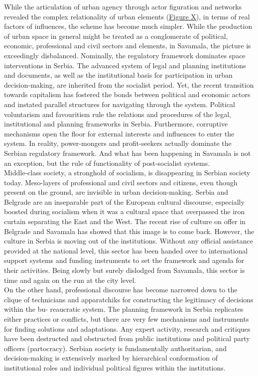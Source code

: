 \documentclass[11pt]{report}
\begin{document}
{{{While the articulation of urban agency through actor figuration and networks revealed the complex relationality of urban elements (\href{ANT diagram}{Figure X}), in terms of real factors of influences, the scheme has become much simpler. While the production of urban space in general might be treated as a conglomerate of political, economic, professional and civil sectors and elements, in Savamala, the picture is exceedingly disbalanced. Nominally, the regulatory framework dominates space interventions in Serbia. The advanced system of legal and planning institutions and documents, as well as the institutional basis for participation in urban decision-making, are inherited from the socialist period. Yet, the recent transition towards capitalism has fostered the bonds between political and economic actors and instated parallel structures for navigating through the system. Political voluntarism and favouritism rule the relations and procedures of the legal, institutional and planning frameworks in Serbia. Furthermore, corruptive mechanisms open the floor for external interests and influences to enter the system. In reality, power-mongers and profit-seekers actually dominate the Serbian regulatory framework. And what has been happening in Savamala is not an exception, but the rule of functionality of post-socialist systems.
\\

Middle-class society, a stronghold of socialism, is disappearing in Serbian society today. Meso-layers of professional and civil sectors and citizens, even though present on the ground, are invisible in urban decision-making. Serbia and Belgrade are an inseparable part of the European cultural discourse, especially boosted during socialism when it was a cultural space that overpassed the iron curtain separating the East and the West. The recent rise of culture on offer in Belgrade and Savamala has showed that this image is to come back. However, the culture in Serbia is moving out of the institutions. Without any official assistance provided at the national level, this sector has been handed over to international support systems and funding instruments to set the framework and agenda for their activities. Being slowly but surely dislodged from Savamala, this sector is time and again on the run at the city level.
\\

On the other hand, professional discourse has become narrowed down to the clique of technicians and apparatchiks for constructing the legitimacy of decisions within the bu- reaucratic system. The planning framework in Serbia replicates either practices or conflicts, but there are very few mechanisms and instruments for finding solutions and adaptations. Any expert activity, research and critiques have been destructed and obstructed from public institutions and political party officers (partocracy). Serbian society is fundamentally authoritarian, and decision-making is extensively marked by hierarchical conformation of institutional roles and individual political figures within the institutions.
\\

}}}
\end{document}
